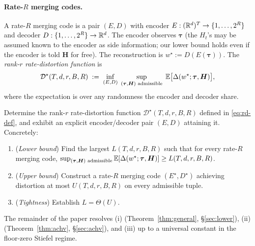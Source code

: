 \paragraph{Rate-$R$ merging codes.} A rate-$R$ merging code is a
pair $(E, D)$ with encoder $E : (\mathbb{R}^d)^T \to \{1,\ldots,2^R\}$
and decoder $D : \{1,\ldots,2^R\}\to\mathbb{R}^d$. The encoder observes
$\boldsymbol\tau$ (the $H_t$'s may be assumed known to the
encoder as side information; our lower bound holds even if the
encoder is told $\boldsymbol H$ for free). The reconstruction is
$w^\star := D(E(\boldsymbol\tau))$. The \emph{rank-$r$
rate-distortion function} is
\begin{equation}\label{eq:rd-def}
  \mathcal{D}^\star(T, d, r, B, R)
  \;:=\; \inf_{(E, D)}\;\sup_{(\boldsymbol\tau, \boldsymbol H)
    \text{ admissible}}\;
  \mathbb{E}\bigl[\Delta(w^\star;\boldsymbol\tau, \boldsymbol H)\bigr],
\end{equation}
where the expectation is over any randomness the encoder and
decoder share.


\begin{problem}
\label{prob:merging}
{\color{red}
Determine the rank-$r$ rate-distortion function
$\mathcal{D}^\star(T, d, r, B, R)$ defined in
\eqref{eq:rd-def}, and exhibit an explicit encoder/decoder pair
$(E, D)$ attaining it. Concretely:
\begin{enumerate}[leftmargin=*,topsep=2pt,itemsep=0pt]
  \item (\emph{Lower bound}) Find the largest $L(T, d, r, B, R)$
  such that for every rate-$R$ merging code,
  $\sup_{(\boldsymbol\tau,\boldsymbol H)\text{ admissible}}
  \mathbb{E}[\Delta(w^\star;\boldsymbol\tau,\boldsymbol H)]\geq
  L(T, d, r, B, R)$.
  \item (\emph{Upper bound}) Construct a rate-$R$ merging code
  $(E^\star, D^\star)$ achieving distortion at most
  $U(T, d, r, B, R)$ on every admissible tuple.
  \item (\emph{Tightness}) Establish $L = \Theta(U)$.
\end{enumerate}
The remainder of the paper resolves (i)
(Theorem~\ref{thm:general}, \S\ref{sec:lower}), (ii)
(Theorem~\ref{thm:achv}, \S\ref{sec:achv}), and (iii) up to a
universal constant in the floor-zero Stiefel regime.
}
\end{problem}

